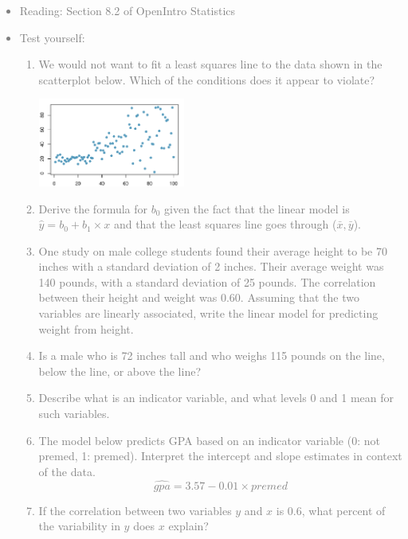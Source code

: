 \documentclass[11pt]{article}
\newcommand{\gray}[1]{\textcolor{gray}{#1}}
\begin{document}
\gray{
{\it
\vspace{-0.55cm}
\begin{itemize}
\renewcommand{\labelitemi}{{\textcolor{dark}{$\ast$}}}
\item Reading: Section 8.2 of OpenIntro Statistics
\item Test yourself:
\begin{enumerate}
\item We would not want to fit a least squares line to the data shown in the scatterplot below. Which of the conditions does it appear to violate?
\begin{center}
\includegraphics[width=0.4\textwidth]{figures/nonconstant_var}
\end{center}
\item Derive the formula for $b_0$ given the fact that the linear model is $\hat{y} = b_0 + b_1 \times x$ and that the least squares line goes through ($\bar{x}, \bar{y}$).
\item One study on male college students found their average height to be 70 inches with a standard deviation of 2 inches. Their average weight was 140 pounds, with a standard deviation of 25 pounds. The correlation between their height and weight was 0.60. Assuming that the two variables are linearly associated, write the linear model for predicting weight from height.
\item Is a male who is 72 inches tall and who weighs 115 pounds on the line, below the line, or above the line?
\item Describe what is an indicator variable, and what levels 0 and 1 mean for such variables.
\item The model below predicts GPA based on an indicator variable (0: not premed, 1: premed). Interpret the intercept and slope estimates in context of the data.
\[ \widehat{gpa} = 3.57 - 0.01 \times premed \]
\item If the correlation between two variables $y$ and $x$ is 0.6, what percent of the variability in $y$ does $x$ explain? 
\end{enumerate}
\end{itemize}
}}

%
\end{document}

